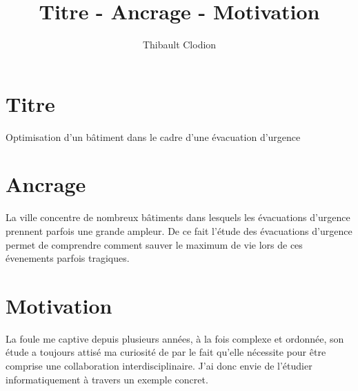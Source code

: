 \documentclass{article}
\title{Titre - Ancrage - Motivation}
\author{Thibault Clodion}
\begin{document}
\maketitle %

\section{Titre}
Optimisation d'un bâtiment dans le cadre d'une évacuation d'urgence

\section{Ancrage}
La ville concentre de nombreux bâtiments dans lesquels les évacuations d'urgence prennent parfois une grande ampleur. De ce fait 
l'étude des évacuations d'urgence permet de comprendre comment sauver le maximum de vie lors de ces évenements parfois tragiques.

\section{Motivation}
La foule me captive depuis plusieurs années, à la fois complexe et ordonnée, son étude a toujours attisé ma curiosité de par le fait qu'elle nécessite pour être
comprise une collaboration interdisciplinaire. J'ai donc envie de l'étudier informatiquement à travers un exemple concret.
\end{document}
